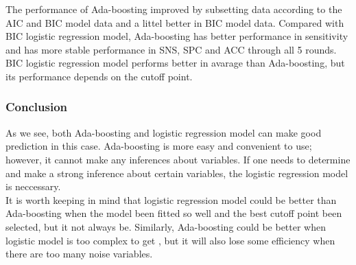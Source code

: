 \documentclass[11pt]{article}\usepackage[]{graphicx}\usepackage[]{color}
\begin{document}
\begin{table}[ht]
\centering
{}
\end{table}
The performance of Ada-boosting improved by subsetting data according to the AIC and BIC model data and  a littel better in BIC model data. Compared with BIC logistic regression model, Ada-boosting has better performance in sensitivity and has more stable performance in SNS, SPC and ACC through all 5 rounds. BIC logistic regression model performs better in avarage than Ada-boosting, but its performance depends on the cutoff point.

\subsubsection{Conclusion}

As we see, both Ada-boosting and logistic regression model can make good prediction in this case. Ada-boosting is more easy and convenient to use; however, it cannot make any inferences about variables. If one needs to determine and make a strong inference about certain variables, the logistic regression model is neccessary. \\
It is worth keeping in mind that logistic regression model could be better than Ada-boosting when the model been fitted so well and the best cutoff point been selected, but it not always be. Similarly, Ada-boosting could be better when logistic model is too complex to get , but it will also lose some efficiency when there are too many noise variables.
\end{document}

